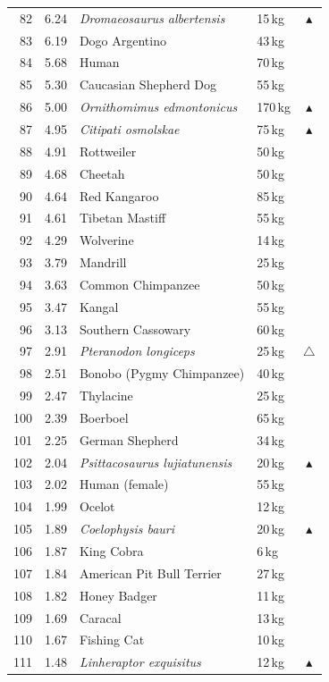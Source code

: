\documentclass[11pt]{article}
\begin{document}
\begin{longtable}{rrllc}
82 & 6.24 & \textit{Dromaeosaurus albertensis} & 15\,kg & $\blacktriangle$ \\
83 & 6.19 & Dogo Argentino & 43\,kg &  \\
84 & 5.68 & Human & 70\,kg &  \\
85 & 5.30 & Caucasian Shepherd Dog & 55\,kg &  \\
86 & 5.00 & \textit{Ornithomimus edmontonicus} & 170\,kg & $\blacktriangle$ \\
87 & 4.95 & \textit{Citipati osmolskae} & 75\,kg & $\blacktriangle$ \\
88 & 4.91 & Rottweiler & 50\,kg &  \\
89 & 4.68 & Cheetah & 50\,kg &  \\
90 & 4.64 & Red Kangaroo & 85\,kg &  \\
91 & 4.61 & Tibetan Mastiff & 55\,kg &  \\
92 & 4.29 & Wolverine & 14\,kg &  \\
93 & 3.79 & Mandrill & 25\,kg &  \\
94 & 3.63 & Common Chimpanzee & 50\,kg &  \\
95 & 3.47 & Kangal & 55\,kg &  \\
96 & 3.13 & Southern Cassowary & 60\,kg &  \\
97 & 2.91 & \textit{Pteranodon longiceps} & 25\,kg & $\triangle$ \\
98 & 2.51 & Bonobo (Pygmy Chimpanzee) & 40\,kg &  \\
99 & 2.47 & Thylacine & 25\,kg &  \\
100 & 2.39 & Boerboel & 65\,kg &  \\
101 & 2.25 & German Shepherd & 34\,kg &  \\
102 & 2.04 & \textit{Psittacosaurus lujiatunensis} & 20\,kg & $\blacktriangle$ \\
103 & 2.02 & Human (female) & 55\,kg &  \\
104 & 1.99 & Ocelot & 12\,kg &  \\
105 & 1.89 & \textit{Coelophysis bauri} & 20\,kg & $\blacktriangle$ \\
106 & 1.87 & King Cobra & 6\,kg &  \\
107 & 1.84 & American Pit Bull Terrier & 27\,kg &  \\
108 & 1.82 & Honey Badger & 11\,kg &  \\
109 & 1.69 & Caracal & 13\,kg &  \\
110 & 1.67 & Fishing Cat & 10\,kg &  \\
111 & 1.48 & \textit{Linheraptor exquisitus} & 12\,kg & $\blacktriangle$ \\

\end{longtable}
\end{document}
